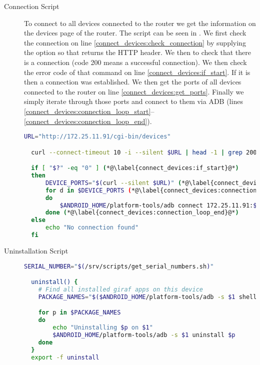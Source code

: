 \begin{description}
  \item[Connection Script] To connect to all devices connected to the router we get the information on the devices page of the router. The script can be seen in . We first check the connection on line \ref{connect_devices:check_connection} by supplying the  option so that  returns the HTTP header. We then  to check that there is a connection (code 200 means a successful connection). We then check the error code of that command on line \ref{connect_devices:if_start}. If it is  then a connection was established. We then get the ports of all devices connected to the router on line \ref{connect_devices:get_ports}. Finally we simply iterate through those ports and connect to them via ADB (lines \ref{connect_devices:connection_loop_start}--\ref{connect_devices:connection_loop_end}).

  \begin{lstlisting}[language=bash,caption=Script that connects to devices,label=lst:connect_devices]
  URL="http://172.25.11.91/cgi-bin/devices"

  curl --connect-timeout 10 -i --silent $URL | head -1 | grep 200 > /dev/null (*@\label{connect_devices:check_connection}@*)

  if [ "$?" -eq "0" ] (*@\label{connect_devices:if_start}@*)
  then
      DEVICE_PORTS="$(curl --silent $URL)" (*@\label{connect_devices:get_ports}@*)
      for d in $DEVICE_PORTS (*@\label{connect_devices:connection_loop_start}@*)
      do
          $ANDROID_HOME/platform-tools/adb connect 172.25.11.91:$d
      done (*@\label{connect_devices:connection_loop_end}@*)
  else
      echo "No connection found"
  fi
  \end{lstlisting}
  \item[Uninstallation Script] \dummy
  \begin{lstlisting}[language=bash,caption=Script that uninstalls all installed Giraf apps on all devices,label=lst:uninstall_apks]
  SERIAL_NUMBER="$(/srv/scripts/get_serial_numbers.sh)"

  uninstall() {
    # Find all installed giraf apps on this device
    PACKAGE_NAMES="$($ANDROID_HOME/platform-tools/adb -s $1 shell pm list packages -f | grep dk.aau.cs.giraf | sed 's/.*apk=//' | tr -d '\n')"

    for p in $PACKAGE_NAMES
    do
        echo "Uninstalling $p on $1"
        $ANDROID_HOME/platform-tools/adb -s $1 uninstall $p
    done
  }
  export -f uninstall


\end{lstlisting}
\end{description}
